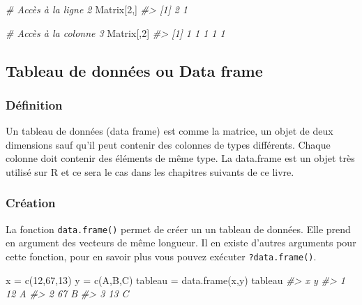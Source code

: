 \documentclass[
]{book}
\newenvironment{Shaded}{\begin{snugshade}}{\end{snugshade}}
\newcommand{\CommentTok}[1]{\textcolor[rgb]{0.56,0.35,0.01}{\textit{#1}}}
\newcommand{\DecValTok}[1]{\textcolor[rgb]{0.00,0.00,0.81}{#1}}
\newcommand{\FunctionTok}[1]{\textcolor[rgb]{0.00,0.00,0.00}{#1}}
\newcommand{\NormalTok}[1]{#1}
\newcommand{\OtherTok}[1]{\textcolor[rgb]{0.56,0.35,0.01}{#1}}
\newcommand{\StringTok}[1]{\textcolor[rgb]{0.31,0.60,0.02}{#1}}
\theoremstyle{definition}
\theoremstyle{definition}
\theoremstyle{definition}
\theoremstyle{definition}
\theoremstyle{remark}
\begin{document}
\begin{Shaded}
\begin{Highlighting}[]
\CommentTok{\# Accès à  la ligne 2 }
\NormalTok{Matrix[}\DecValTok{2}\NormalTok{,]}
\CommentTok{\#\textgreater{} [1] 2 1}
\end{Highlighting}
\end{Shaded}

\begin{Shaded}
\begin{Highlighting}[]
\CommentTok{\# Accès à la colonne 3}
\NormalTok{Matrix[,}\DecValTok{2}\NormalTok{]}
\CommentTok{\#\textgreater{} [1] 1 1 1 1 1}
\end{Highlighting}
\end{Shaded}

\hypertarget{dataframe}{%
\subsection{Tableau de données ou Data frame}\label{dataframe}}

\hypertarget{duxe9finition-4}{%
\subsubsection*{Définition}\label{duxe9finition-4}}

Un tableau de données (data frame) est comme la matrice, un objet de deux dimensions sauf qu'il peut contenir des colonnes de types différents. Chaque colonne doit contenir des éléments de même type. La data.frame est un objet très utilisé sur R et ce sera le cas dans les chapitres suivants de ce livre.

\hypertarget{cruxe9ation-4}{%
\subsubsection*{Création}\label{cruxe9ation-4}}

La fonction \texttt{data.frame()} permet de créer un un tableau de données. Elle prend en argument des vecteurs de même longueur. Il en existe d'autres arguments pour cette fonction, pour en savoir plus vous pouvez exécuter \texttt{?data.frame()}.

\begin{Shaded}
\begin{Highlighting}[]
\NormalTok{x }\OtherTok{=} \FunctionTok{c}\NormalTok{(}\DecValTok{12}\NormalTok{,}\DecValTok{67}\NormalTok{,}\DecValTok{13}\NormalTok{)}
\NormalTok{y }\OtherTok{=} \FunctionTok{c}\NormalTok{(}\StringTok{\textquotesingle{}A\textquotesingle{}}\NormalTok{,}\StringTok{\textquotesingle{}B\textquotesingle{}}\NormalTok{,}\StringTok{\textquotesingle{}C\textquotesingle{}}\NormalTok{)}
\NormalTok{tableau }\OtherTok{=} \FunctionTok{data.frame}\NormalTok{(x,y)}
\NormalTok{tableau}
\CommentTok{\#\textgreater{}    x y}
\CommentTok{\#\textgreater{} 1 12 A}
\CommentTok{\#\textgreater{} 2 67 B}
\CommentTok{\#\textgreater{} 3 13 C}
\end{Highlighting}
\end{Shaded}
\end{document}
